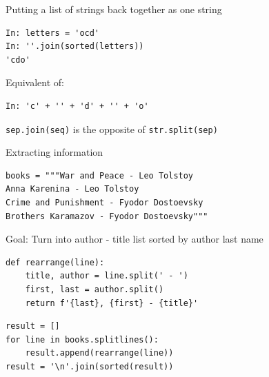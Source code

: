 \documentclass[aspectratio=169,usenames,dvipsnames]{beamer}
\begin{document}
\begin{frame}[fragile]{Putting a list of strings back together as one string}
\begin{lstlisting}
In: letters = 'ocd'
In: ''.join(sorted(letters))
'cdo'
\end{lstlisting}
Equivalent of:
\begin{lstlisting}
In: 'c' + '' + 'd' + '' + 'o'
\end{lstlisting}

\lstinline{sep.join(seq)} is the opposite of \lstinline{str.split(sep)}
\end{frame}

\begin{frame}[fragile]{Extracting information}
\begin{lstlisting}
books = """War and Peace - Leo Tolstoy
Anna Karenina - Leo Tolstoy
Crime and Punishment - Fyodor Dostoevsky
Brothers Karamazov - Fyodor Dostoevsky"""
\end{lstlisting}
Goal: Turn into author - title list sorted by author last name
\pause
\begin{lstlisting}
def rearrange(line):
    title, author = line.split(' - ')
    first, last = author.split()
    return f'{last}, {first} - {title}'
\end{lstlisting}
\pause
\begin{lstlisting}
result = []
for line in books.splitlines():
    result.append(rearrange(line))
result = '\n'.join(sorted(result))
\end{lstlisting}
\end{frame}
\end{document}
